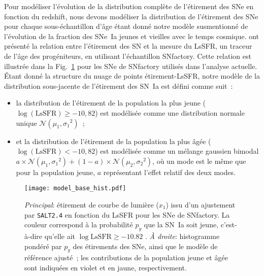 \documentclass[../main/main.tex]{subfiles}
\begin{document}
Pour modéliser l'évolution de la distribution complète de l'étirement des SNe en
fonction du redshift, nous devons modéliser la distribution de l'étirement des
SNe pour chaque sous-échantillon d'âge étant donné notre modèle susmentionné de
l'évolution de la fraction des SNe~Ia jeunes et vieilles avec le temps cosmique.
\cite{rigault2020} ont présenté la relation entre l'étirement des SN et la
mesure du LsSFR, un traceur de l'âge des progéniteurs, en utilisant
l'échantillon SNfactory. Cette relation est illustrée dans la
Fig.~\ref{fig:stretchlssfr} pour les SNe de SNfactory utilisés dans l'analyse
actuelle. Étant donné la structure du nuage de points étirement-LsSFR, notre
modèle de la distribution sous-jacente de l'étirement des SN~Ia est défini comme
suit~:
\begin{itemize}
    \item la distribution de l'étirement de la population la plus jeune
        ($\log(\mathrm{LsSFR})\geq-10,82$) est modélisée comme une distribution
        normale unique $\mathcal{N}(\mu_1, \sigma_1{}^2)$~;
    \item et la distribution de l'étirement de la population la plus âgée
        ($\log(\mathrm{LsSFR})<-10,82$) est modélisée comme un mélange gaussien
        bimodal $a\times \mathcal{N} (\mu_1, \sigma_1{}^2) + (1-a)\times
        \mathcal{N}(\mu_2, \sigma_2{}^2)$, où un mode est le même que pour la
        population jeune, $a$ représentant l'effet relatif des deux modes.
\end{itemize}

\begin{figure}
    \centering
    \texttt{[image: model\_base\_hist.pdf]}
    \caption[Étirement en fonction du LsSFR des SNe~Ia de SNfactory et modèles
    d'étirement de référence ajustés]{\textit{Principal}: étirement de courbe de
        lumière ($x_1$) issu d'un ajustement par \textsc{\texttt{SALT2.4}} en
        fonction du LsSFR pour les SNe de SNfactory. La couleur correspond à la
        probabilité $p_y$ que la SN~Ia soit jeune, c'est-à-dire qu'elle ait
        $\log\mathrm{LsSFR} \geq -10.82$ \citep[voir][]{rigault2020}. \textit{À
        droite}: histogramme pondéré par $p_y$ des étirements des SNe, ainsi que
        le modèle de référence ajusté~; les contributions de la population jeune
    et âgée sont indiquées en violet et en jaune, respectivement.}
    \label{fig:stretchlssfr}
\end{figure}
\end{document}
